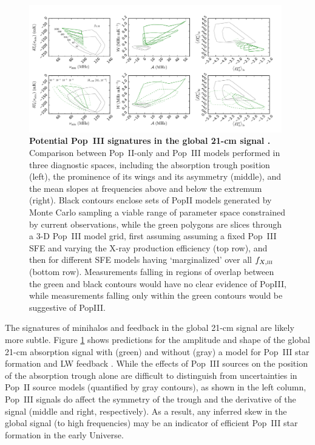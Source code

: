 \begin{figure}[]
\begin{center}
\includegraphics[width=0.98\textwidth]{Mirocha/mirocha2018_fig6.pdf}
\end{center}
\caption{{\bf Potential Pop~III signatures in the global 21-cm signal \cite{Mirocha2018}.} Comparison between Pop~II-only and Pop~III models performed in three diagnostic spaces, including the absorption trough position (left), the prominence of its wings and its asymmetry (middle), and the mean slopes at frequencies above and below the extremum (right). Black contours enclose sets of PopII models generated by Monte Carlo sampling a viable range of parameter space constrained by current observations, while the green polygons are slices through a 3-D Pop~III model grid, first assuming assuming a fixed Pop~III SFE and varying the X-ray production efficiency (top row), and then for different SFE models having ‘marginalized’ over all $f_{X,\textsc{iii}}$ (bottom row). Measurements falling in regions of overlap between the green and black contours would have no clear evidence of PopIII, while measurements falling only within the green contours would be suggestive of PopIII.}
\label{fig:popIII_gs}
\end{figure}

The signatures of minihalos and feedback in the global 21-cm signal are likely more subtle. Figure \ref{fig:popIII_gs} shows predictions for the amplitude and shape of the global 21-cm absorption signal with (green) and without (gray) a model for Pop~III star formation and LW feedback \cite{Mirocha2018}. While the effects of Pop~III sources on the position of the absorption trough alone are difficult to distinguish from uncertainties in Pop~II source models (quantified by gray contours), as shown in the left column, Pop~III signals do affect the symmetry of the trough and the derivative of the signal (middle and right, respectively). As a result, any inferred skew in the global signal (to high frequencies) may be an indicator of efficient Pop~III star formation in the early Universe.

